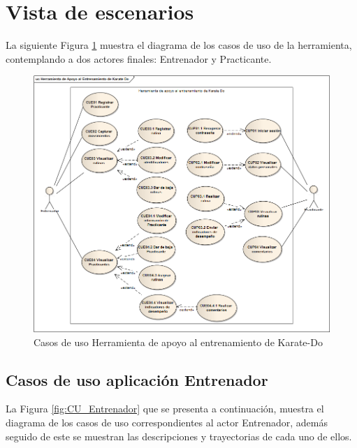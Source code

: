 \section{Vista de escenarios}
La siguiente Figura \ref{fig:CU_General}  muestra  el diagrama de los casos de uso de la herramienta, contemplando a dos actores finales: Entrenador y Practicante.\\

\begin{figure}[H]
	\begin{center}
		\includegraphics[scale=0.5]{./Figuras/Casos/CUGeneral}
	\end{center}
	\caption{Casos de uso Herramienta de apoyo al entrenamiento de Karate-Do}
	\label{fig:CU_General}
\end{figure}

\clearpage
\subsection{Casos de uso aplicación Entrenador}
La Figura \ref{fig:CU_Entrenador}  que se presenta a continuación, muestra el diagrama de los casos de uso correspondientes al actor Entrenador, además seguido de este se muestran las descripciones y trayectorias de cada uno de ellos.

